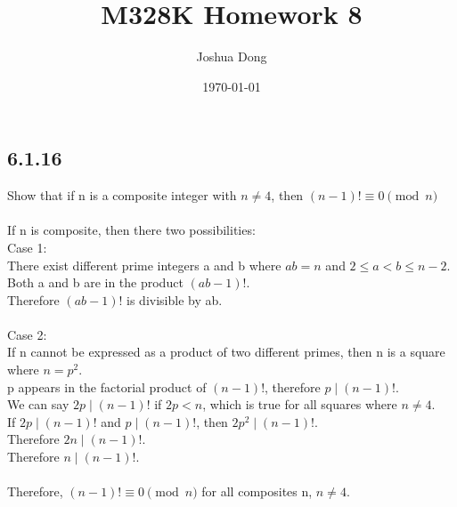 \documentclass{article}
\begin{document}
\title{M328K\: Homework 8}
\author{Joshua Dong}
\date{\today}
\maketitle

\subsection{6.1.16}
Show that if n is a composite integer with $n \neq 4$,
then $(n-1)! \equiv 0 \pmod{n}$
\\
\\If n is composite, then there two possibilities:
\\Case 1:
\\There exist different prime integers a and b where $ab = n$ 
and $2 \le a < b \le n-2$.
\\Both a and b are in the product $(ab-1)!$.
\\Therefore $(ab-1)!$ is divisible by ab.
\\
\\Case 2:
\\If n cannot be expressed as a product of two different primes,
then n is a square where $n = p^2$.
\\p appears in the factorial product of $(n-1)!$, therefore $p \mid (n-1)!$.
\\We can say $2p \mid (n-1)!$ if $2p < n$,
which is true for all squares where $n \neq 4$.
\\If $2p \mid (n-1)!$ and $p \mid (n-1)!$, then $2p^2 \mid (n-1)!$.
\\Therefore $2n \mid (n-1)!$.
\\Therefore $n \mid (n-1)!$.
\\
\\Therefore, $(n-1)! \equiv 0 \pmod{n}$ for all composites n, $n\neq4$.
\newpage
\end{document}
